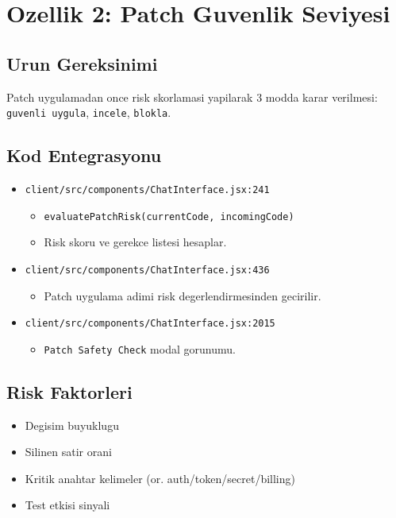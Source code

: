 \documentclass[12pt,a4paper]{article}
\begin{document}
\section{Ozellik 2: Patch Guvenlik Seviyesi}
\subsection{Urun Gereksinimi}
Patch uygulamadan once risk skorlamasi yapilarak 3 modda karar verilmesi:
\texttt{guvenli uygula}, \texttt{incele}, \texttt{blokla}.

\subsection{Kod Entegrasyonu}
\begin{itemize}[leftmargin=*]
  \item \texttt{client/src/components/ChatInterface.jsx:241}
  \begin{itemize}[leftmargin=*]
    \item \texttt{evaluatePatchRisk(currentCode, incomingCode)}
    \item Risk skoru ve gerekce listesi hesaplar.
  \end{itemize}

  \item \texttt{client/src/components/ChatInterface.jsx:436}
  \begin{itemize}[leftmargin=*]
    \item Patch uygulama adimi risk degerlendirmesinden gecirilir.
  \end{itemize}

  \item \texttt{client/src/components/ChatInterface.jsx:2015}
  \begin{itemize}[leftmargin=*]
    \item \texttt{Patch Safety Check} modal gorunumu.
  \end{itemize}
\end{itemize}

\subsection{Risk Faktorleri}
\begin{itemize}[leftmargin=*]
  \item Degisim buyuklugu
  \item Silinen satir orani
  \item Kritik anahtar kelimeler (or. auth/token/secret/billing)
  \item Test etkisi sinyali
\end{itemize}
\end{document}
